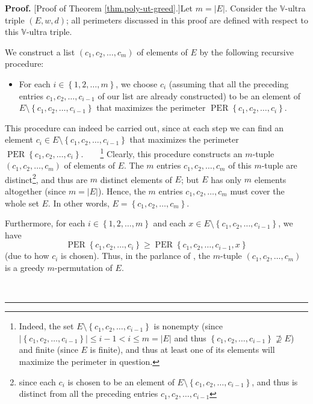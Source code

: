 \documentclass[numbers=enddot,12pt,final,onecolumn,notitlepage]{scrartcl}%
\theoremstyle{definition}
\newenvironment{proof}[1][Proof]{\noindent\textbf{#1.} }{\ \rule{0.5em}{0.5em}}
\renewcommand{\leq}{\leqslant}
\renewcommand{\geq}{\geqslant}
\theoremstyle{plainsl}
\begin{document}
\begin{proof}
[Proof of Theorem \ref{thm.poly-ut-greed}.]Let $m=\left\vert E\right\vert $.
Consider the $\mathbb{V}$-ultra triple $\left(  E,w,d\right)  $; all
perimeters discussed in this proof are defined with respect to this
$\mathbb{V}$-ultra triple.

We construct a list $\left(  c_{1},c_{2},\ldots,c_{m}\right)  $ of elements of
$E$ by the following recursive procedure:

\begin{itemize}
\item For each $i\in\left\{  1,2,\ldots,m\right\}  $, we choose $c_{i}$
(assuming that all the preceding entries $c_{1},c_{2},\ldots,c_{i-1}$ of our
list are already constructed) to be an element of $E\setminus\left\{
c_{1},c_{2},\ldots,c_{i-1}\right\}  $ that maximizes the perimeter
$\operatorname*{PER}\left\{  c_{1},c_{2},\ldots,c_{i}\right\}  $.
\end{itemize}

\noindent This procedure can indeed be carried out, since at each step we can
find an element $c_{i}\in E\setminus\left\{  c_{1},c_{2},\ldots,c_{i-1}%
\right\}  $ that maximizes the perimeter $\operatorname{PER}\left\{
c_{1},c_{2},\ldots,c_{i}\right\}  $.\ \ \ \ \footnote{Indeed, the set
$E\setminus\left\{  c_{1},c_{2},\ldots,c_{i-1}\right\}  $ is nonempty (since
$\left\vert \left\{  c_{1},c_{2},\ldots,c_{i-1}\right\}  \right\vert \leq
i-1<i\leq m=\left\vert E\right\vert $ and thus $\left\{  c_{1},c_{2}%
,\ldots,c_{i-1}\right\}  \not \supseteq E$) and finite (since $E$ is finite),
and thus at least one of its elements will maximize the perimeter in
question.} Clearly, this procedure constructs an $m$-tuple $\left(
c_{1},c_{2},\ldots,c_{m}\right)  $ of elements of $E$. The $m$ entries
$c_{1},c_{2},\ldots,c_{m}$ of this $m$-tuple are distinct\footnote{since each
$c_{i}$ is chosen to be an element of $E\setminus\left\{  c_{1},c_{2}%
,\ldots,c_{i-1}\right\}  $, and thus is distinct from all the preceding
entries $c_{1},c_{2},\ldots,c_{i-1}$}, and thus are $m$ distinct elements of
$E$; but $E$ has only $m$ elements altogether (since $m=\left\vert
E\right\vert $). Hence, the $m$ entries $c_{1},c_{2},\ldots,c_{m}$ must cover
the whole set $E$. In other words, $E=\left\{  c_{1},c_{2},\ldots
,c_{m}\right\}  $.

Furthermore, for each $i\in\left\{  1,2,\ldots,m\right\}  $ and each $x\in
E\setminus\left\{  c_{1},c_{2},\ldots,c_{i-1}\right\}  $, we have
\begin{equation}
\operatorname*{PER}\left\{  c_{1},c_{2},\ldots,c_{i}\right\}  \geq
\operatorname*{PER}\left\{  c_{1},c_{2},\ldots,c_{i-1},x\right\}
\label{pf.thm.poly-ut-greed.greedy}%
\end{equation}
(due to how $c_{i}$ is chosen). Thus, in the parlance of \cite[\S 3.2]%
{GriPet19}, the $m$-tuple $\left(  c_{1},c_{2},\ldots,c_{m}\right)  $ is a
greedy $m$-permutation of $E$.


\end{proof}
\end{document}

